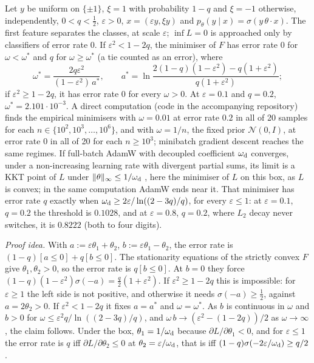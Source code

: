 \begin{example}\label{ex:teacher:weightdecay}
Let $y$ be uniform on $\{\pm1\}$, $\xi=1$ with probability $1-q$ and $\xi=-1$ otherwise, independently, $0<q<\frac12$, $\varepsilon>0$, $x=(\varepsilon y,\xi y)$ and $p_\theta(y\mid x)=\sigma(y\,\theta\cdot x)$. The first feature separates the classes, at scale $\varepsilon$; $\inf L=0$ is approached only by classifiers of error rate $0$. If $\varepsilon^2<1-2q$, the minimiser of $F$ has error rate $0$ for $\omega<\omega^*$ and $q$ for $\omega\ge\omega^*$ (a tie counted as an error), where
\[
\omega^*=\frac{2q\varepsilon^2}{(1-\varepsilon^2)\,a^*},\qquad a^*=\ln\frac{2(1-q)(1-\varepsilon^2)-q(1+\varepsilon^2)}{q(1+\varepsilon^2)};
\]
if $\varepsilon^2\ge1-2q$, it has error rate $0$ for every $\omega>0$. At $\varepsilon=0.1$ and $q=0.2$, $\omega^*=2.101\cdot10^{-3}$. A direct computation (code in the accompanying repository) finds the empirical minimisers with $\omega=0.01$ at error rate $0.2$ in all of 20 samples for each $n\in\{10^2,10^3,\dots,10^6\}$, and with $\omega=1/n$, the fixed prior $\mathcal N(0,I)$, at error rate $0$ in all of 20 for each $n\ge10^3$; minibatch gradient descent reaches the same regimes. If full-batch AdamW with decoupled coefficient $\omega_{\rm d}$ converges, under a non-increasing learning rate with divergent partial sums, its limit is a KKT point of $L$ under $\|\theta\|_\infty\le1/\omega_{\rm d}$ \citep{xie2024implicit}, here the minimiser of $L$ on this box, as $L$ is convex; in the same computation AdamW ends near it. That minimiser has error rate $q$ exactly when $\omega_{\rm d}\ge2\varepsilon/\ln((2-3q)/q)$, for every $\varepsilon\le1$: at $\varepsilon=0.1$, $q=0.2$ the threshold is $0.1028$, and at $\varepsilon=0.8$, $q=0.2$, where $L_2$ decay never switches, it is $0.8222$ (both to four digits).
\end{example}

\emph{Proof idea.} With $a:=\varepsilon\theta_1+\theta_2$, $b:=\varepsilon\theta_1-\theta_2$, the error rate is $(1-q)[a\le0]+q[b\le0]$. The stationarity equations of the strictly convex $F$ give $\theta_1,\theta_2>0$, so the error rate is $q[b\le0]$. At $b=0$ they force $(1-q)(1-\varepsilon^2)\sigma(-a)=\frac q2(1+\varepsilon^2)$. If $\varepsilon^2\ge1-2q$ this is impossible: for $\varepsilon\ge1$ the left side is not positive, and otherwise it needs $\sigma(-a)\ge\frac12$, against $a=2\theta_2>0$. If $\varepsilon^2<1-2q$ it fixes $a=a^*$ and $\omega=\omega^*$. As $b$ is continuous in $\omega$ and $b>0$ for $\omega\le\varepsilon^2q/\ln((2-3q)/q)$, and $\omega\,b\to(\varepsilon^2-(1-2q))/2$ as $\omega\to\infty$, the claim follows. Under the box, $\theta_1=1/\omega_{\rm d}$ because $\partial L/\partial\theta_1<0$, and for $\varepsilon\le1$ the error rate is $q$ iff $\partial L/\partial\theta_2\le0$ at $\theta_2=\varepsilon/\omega_{\rm d}$, that is iff $(1-q)\sigma(-2\varepsilon/\omega_{\rm d})\ge q/2$.

